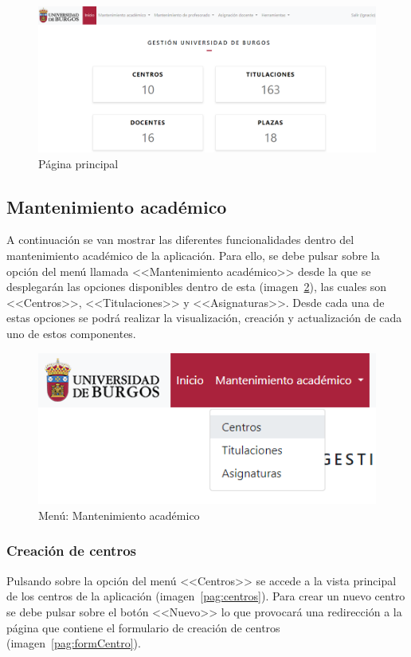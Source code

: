 \begin{figure}
	\centering
	\includegraphics[width=\textwidth]{../img/Anexos/Manual usuario/inicio.png}
	\caption{Página principal}\label{pag:inicio}
\end{figure}

\subsection{Mantenimiento académico}
A continuación se van mostrar las diferentes funcionalidades dentro del mantenimiento académico de la aplicación.
Para ello, se debe pulsar sobre la opción del menú llamada <<Mantenimiento académico>> desde la que se desplegarán las opciones disponibles dentro de esta (imagen~\ref{pag:menuManAc}), las cuales son <<Centros>>, <<Titulaciones>> y <<Asignaturas>>.
Desde cada una de estas opciones se podrá realizar la visualización, creación y actualización de cada uno de estos componentes.

\begin{figure}
	\centering
	\includegraphics[width=\textwidth]{../img/Anexos/Manual usuario/menu man ac.png}
	\caption{Menú: Mantenimiento académico}\label{pag:menuManAc}
\end{figure}

\subsubsection{Creación de centros}
Pulsando sobre la opción del menú <<Centros>> se accede a la vista principal de los centros de la aplicación (imagen~\ref{pag:centros}).
Para crear un nuevo centro se debe pulsar sobre el botón <<Nuevo>> lo que provocará una redirección a la página que contiene el formulario de creación de centros (imagen~\ref{pag:formCentro}).

